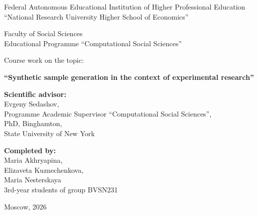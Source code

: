 \documentclass[14pt,a4paper]{extarticle}
\begin{document}
\begin{titlepage}
\begin{center}

{\normalsize
Federal Autonomous Educational Institution of Higher Professional Education\\
``National Research University Higher School of Economics''
}

\vspace{1.2cm}

{\normalsize
Faculty of Social Sciences\\
Educational Programme ``Computational Social Sciences''
}

\vspace{2.4cm}

{\normalsize
Course work on the topic:
}

\vspace{0.6cm}

{\large\bfseries
``Synthetic sample generation in the context of experimental research''
}

\vspace{1cm}

\vfill

\begin{flushright}
\begin{minipage}{0.48\textwidth}
\raggedright
\textbf{Scientific advisor:}\\
Evgeny Sedashov,\\
Programme Academic Supervisor ``Computational Social Sciences'',\\
PhD, Binghamton, \\
State University of New York
\end{minipage}
\end{flushright}

\vspace{1cm}

\begin{flushright}
\begin{minipage}{0.48\textwidth}
\raggedright
\textbf{Completed by:}\\
Maria Akhryapina,\\
Elizaveta Kuznechenkova,\\
Maria Nesterskaya\\
3rd-year students of group BVSN231
\end{minipage}
\end{flushright}

\vfill

{\normalsize
Moscow, 2026
}

\end{center}
\end{titlepage}
\end{document}
